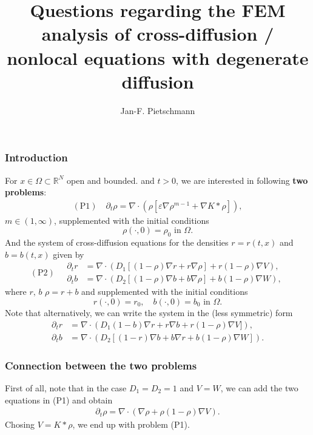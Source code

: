 \documentclass[11pt,a4paper]{article}
\title{Questions regarding the FEM analysis of cross-diffusion / nonlocal equations with degenerate diffusion}
\author{Jan-F. Pietschmann}
\def\eps{\varepsilon}
\def\RR{\mathbb{R}}
\theoremstyle{definition}
\numberwithin{equation}{section}
\begin{document}
\maketitle
\subsubsection*{Introduction}
For $x\in\Omega\subset \RR^N$ open and bounded. and $t>0$, we are interested in following \textbf{two problems}:
\begin{align}\label{eq:porousfem}
\mathrm{(P1)}\quad\partial_t \rho = \nabla\cdot (\rho [ \eps\nabla \rho^{m-1} + \nabla K \ast \rho]),
\end{align}
$m\in (1,\infty)$, supplemented with the initial conditions
\begin{equation}
	\rho(\cdot,0) = \rho_0\text{ in } \Omega.
\end{equation}
And the system of cross-diffusion equations for the densities $r=r(t,x)$ and $b=b(t,x)$ given by
\begin{equation*}
    \mathrm{(P2)}\quad\begin{aligned}
 \partial_t r &= \nabla \cdot (D_1[(1-\rho)\nabla r + r \nabla \rho ] + r(1-\rho)\nabla V),\\
\partial_t b &= \nabla \cdot (D_2[ (1-\rho)\nabla b + b \nabla \rho ] + b(1-\rho)\nabla W),   \end{aligned}    
\end{equation*}
where $r,\,b$  $\rho = r+b$ and supplemented with the initial conditions
\begin{equation}
	r(\cdot,0) = r_0, \quad b(\cdot,0) = b_0 \text{ in } \Omega.
\end{equation}
Note that alternatively, we can write the system in the (less symmetric) form
 \begin{equation}
    \begin{aligned}
 \partial_t r &= \nabla \cdot (D_1(1-b)\nabla r + r \nabla b + r(1-\rho)\nabla V]),\\
 \partial_t b &= \nabla \cdot (D_2[ (1-r)\nabla b + b \nabla r + b(1-\rho)\nabla W]).
\end{aligned}    
\end{equation}
\subsubsection*{Connection between the two problems}
First of all, note that in the case $D_1=D_2=1$ and $V=W$, we can add the two equations in (P1) and obtain
\begin{align}\label{eq:sum}
 \partial_t \rho = \nabla\cdot (\nabla \rho + \rho(1-\rho)\nabla V).
\end{align}
Chosing $V = K \ast \rho$, we end up with problem (P1).
\end{document}

